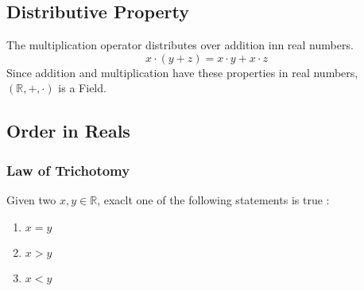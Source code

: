 \documentclass{scrartcl}
\newcommand{\rn}{\mathbb{R}}
\begin{document}
    \subsection{Distributive Property}
    The multiplication operator distributes over addition inn real numbers.
    $$x \cdot (y + z) = x \cdot y + x \cdot z$$
    Since addition and multiplication have these properties in real numbers, $(\rn, +, \cdot)$ is a Field.
    \subsection{Order in Reals}
    \subsubsection{Law of Trichotomy}
    Given two $x, y \in \rn$, exaclt one of the following statements is true :
    \begin{enumerate}[label={(\roman*)}]
        \item $x = y$
        \item $x > y$
        \item $x < y$
    \end{enumerate}
\end{document}
